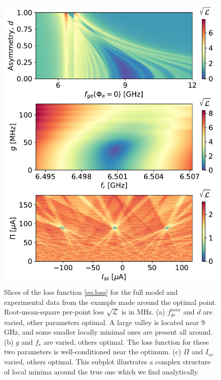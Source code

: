 \documentclass[%
 aip,
 amsmath,amssymb,
 reprint,%
]{revtex4-1}
\begin{document}
\begin{figure}
	\centering
	\includegraphics[width=\linewidth]{loss1}
	\caption{Slices of the loss function \eqref{eq:loss} for the full model and experimental data from the example made around the optimal point. Root-mean-square per-point loss $\sqrt{\mathcal{L}}$ is in MHz. (a) $f_{ge}^{max}$ and $d$ are varied, other parameters optimal. A large valley is located near 9 GHz, and some smaller locally minimal ones are present all around. (b) $g$ and $f_r$ are varied, others optimal. The loss function for these two parameters is well-conditioned near the optimum. (c) $\Pi$ and $I_{ss}$ varied, others optimal. This subplot illustrates a complex structure of local minima around the true one which we find analytically.}
	\label{fig:loss}
\end{figure}
\end{document}
